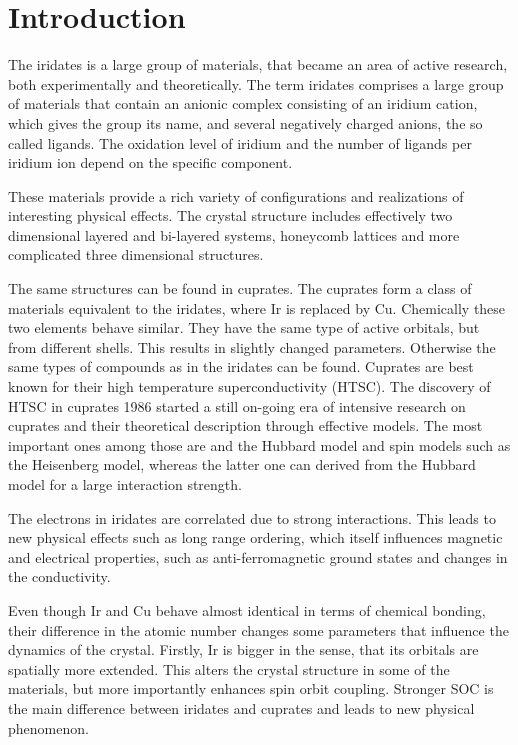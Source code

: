 \chapter{Introduction}





The iridates is a large group of materials, that became an area of active research, both experimentally and theoretically. 
The term iridates comprises a large group of materials that contain an anionic complex 
consisting of an iridium cation, which gives the group its name, 
and several negatively charged anions, the so called ligands.
The oxidation level of iridium and the number of ligands per iridium ion depend on the specific component.



These materials provide a rich variety of configurations and realizations of interesting physical effects.
The crystal structure includes effectively two dimensional layered  and bi-layered systems, 
honeycomb lattices and more complicated three dimensional structures. 

The same structures can be found in cuprates. 
The cuprates form a class of materials equivalent to the iridates, where Ir is replaced by Cu. 
Chemically these two elements behave similar.
They have the same type of active orbitals, but from different shells. 
This results in slightly changed parameters. 
Otherwise the same types of compounds as in the iridates can be found. 
Cuprates are best known for their high temperature superconductivity (HTSC).
The discovery of HTSC in cuprates 1986 \cite{cuprateHTSC} 
started a still on-going era of intensive research on cuprates and their theoretical description through effective models.
The most important ones  among those  are and the Hubbard model and spin models such as the Heisenberg model, whereas the latter one can 
derived from the Hubbard model for a large interaction strength. 


The electrons in iridates are correlated due to strong interactions.
This leads to new physical effects such as long range ordering,
which itself influences magnetic and electrical properties,
such as anti-ferromagnetic ground states and changes in the conductivity. 

Even though Ir and Cu behave almost identical in terms of chemical bonding, 
their difference in the atomic number changes some parameters that influence the dynamics of the crystal. 
Firstly, Ir is bigger in the sense, that its orbitals are spatially more extended. 
This alters the crystal structure in some of the materials, but more importantly enhances spin orbit coupling.
Stronger SOC is the main difference between iridates and cuprates and leads to new physical phenomenon. 


